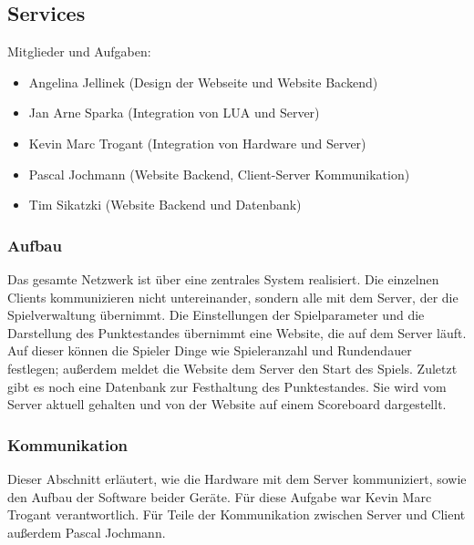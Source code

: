 \newpage
\subsection{Services}
\label{sec:services}

Mitglieder und Aufgaben:
\begin{itemize}
  \item
    Angelina Jellinek (Design der Webseite und Website Backend)
  \item
    Jan Arne Sparka (Integration von LUA und Server)
  \item
    Kevin Marc Trogant (Integration von Hardware und Server)
  \item
    Pascal Jochmann (Website Backend, Client-Server Kommunikation)
  \item
    Tim Sikatzki (Website Backend und Datenbank)
\end{itemize}

\subsubsection{Aufbau}
\label{sec:services-aufbau}
Das gesamte Netzwerk ist über eine zentrales System realisiert. Die einzelnen 
Clients kommunizieren nicht untereinander, sondern alle mit dem Server, der die Spielverwaltung übernimmt. 
Die Einstellungen der Spielparameter und die Darstellung des Punktestandes übernimmt eine Website, die auf dem Server läuft. 
Auf dieser können die Spieler Dinge wie Spieleranzahl und Rundendauer festlegen; außerdem meldet 
die Website dem Server den Start des Spiels. Zuletzt gibt es noch eine Datenbank zur Festhaltung des Punktestandes. 
Sie wird vom Server aktuell gehalten und von der Website auf einem Scoreboard dargestellt.

\subsubsection{Kommunikation}
\label{sec:services-kommunikation}
Dieser Abschnitt erläutert, wie die Hardware mit dem Server kommuniziert, sowie den Aufbau der Software beider Geräte.
Für diese Aufgabe war Kevin Marc Trogant verantwortlich. Für Teile der Kommunikation zwischen Server und Client außerdem Pascal Jochmann.

